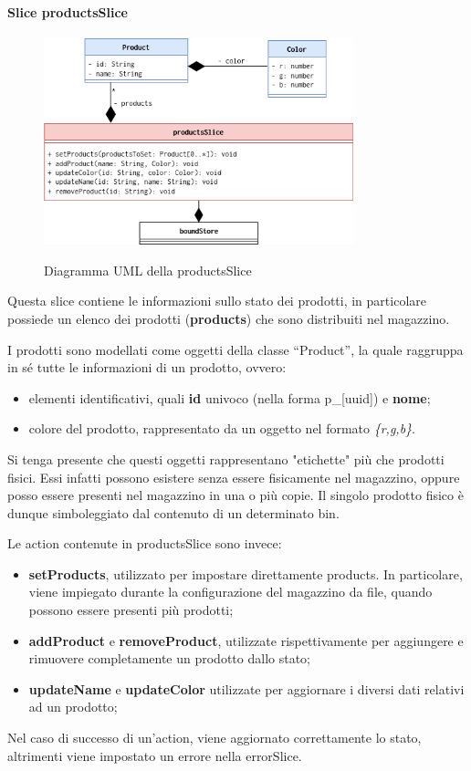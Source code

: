 \paragraph{Slice productsSlice}
\begin{figure}[H]
    \centering
    \includegraphics[width=0.8\textwidth]{images/UML/feature_model_productsSlice.drawio.png}
    \label{fig:UML_productsSlice}
    \caption{Diagramma UML della productsSlice}
\end{figure}
Questa slice contiene le informazioni sullo stato dei prodotti, in particolare possiede un elenco dei prodotti (\textbf{products}) che sono distribuiti nel magazzino.

I prodotti sono modellati come oggetti della classe ``Product'', la quale raggruppa in sé tutte le informazioni di un prodotto, ovvero:
\begin{itemize}
    \item elementi identificativi, quali \textbf{id} univoco (nella forma p\_[uuid]) e \textbf{nome};
    \item colore del prodotto, rappresentato da un oggetto nel formato \textit{\{r,g,b\}}.
\end{itemize}
Si tenga presente che questi oggetti rappresentano "etichette" più che prodotti fisici. Essi infatti possono esistere senza essere fisicamente nel magazzino, oppure posso essere presenti nel magazzino in una o più copie. Il singolo prodotto fisico è dunque simboleggiato dal contenuto di un determinato bin.

\bigskip
\noindent Le action contenute in productsSlice sono invece:
\begin{itemize}
    \item \textbf{setProducts}, utilizzato per impostare direttamente products. In particolare, viene impiegato durante la configurazione del magazzino da file, quando possono essere presenti più prodotti;
    \item \textbf{addProduct} e \textbf{removeProduct}, utilizzate rispettivamente per aggiungere e rimuovere completamente un prodotto dallo stato;
    \item \textbf{updateName} e \textbf{updateColor} utilizzate per aggiornare i diversi dati relativi ad un prodotto;
\end{itemize}
Nel caso di successo di un'action, viene aggiornato correttamente lo stato, altrimenti viene impostato un errore nella errorSlice.


